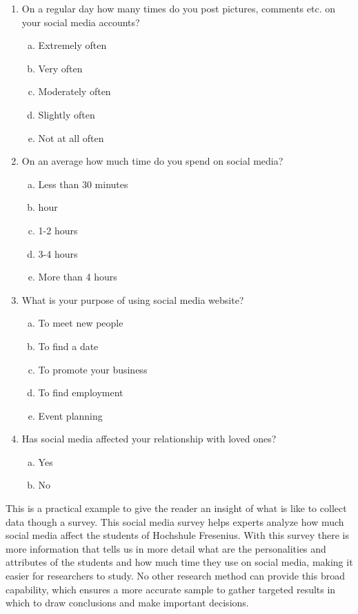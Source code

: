 \begin{enumerate}[1)]
\item On a regular day how many times do you post pictures, comments etc. on your social media accounts?

	\begin{enumerate}[a)]
	\item Extremely often
	\item Very often
	\item Moderately often
	\item Slightly often
	\item Not at all often 
	\end{enumerate}
	
\item On an average how much time do you spend on social media?

	\begin{enumerate}[a)]
	\item Less than 30 minutes
	\item hour
	\item 1-2 hours
	\item 3-4 hours
	\item More than 4 hours
	\end{enumerate}

\item What is your purpose of using social media website?

	\begin{enumerate}[a)]
	\item To meet new people
	\item To find a date
	\item To promote your business
	\item To find employment 
	\item Event planning
	\end{enumerate}
	
\item Has social media affected your relationship with loved ones?

	\begin{enumerate}[a)]
	\item Yes
	\item No
	\end{enumerate}

\end{enumerate}
This is a practical example to give the reader an insight of what is like to collect data though a survey. This social media survey helps experts analyze how much social media affect the students of Hochshule Fresenius. With this survey there is more information that tells us in more detail what are the personalities and attributes of the students and how much time they use on social media, making it easier for researchers to study.  No other research method can provide this broad capability, which ensures a more accurate sample to gather targeted results in which to draw conclusions and make important decisions.

